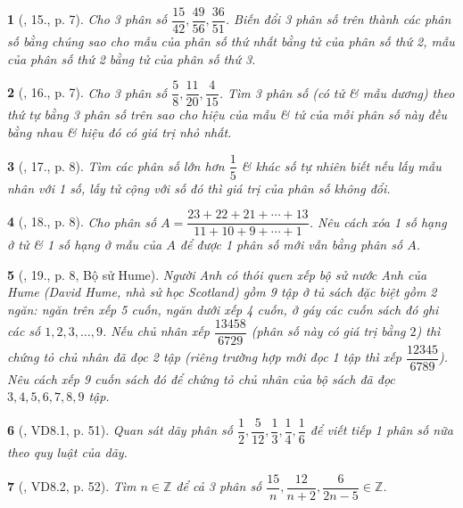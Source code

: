 \documentclass{article}
\newtheorem{baitoan}{}
\begin{document}
\begin{baitoan}[\cite{Binh_Toan_6_tap_2}, 15., p. 7]
	Cho 3 phân số $\dfrac{15}{42},\dfrac{49}{56},\dfrac{36}{51}$. Biến đổi 3 phân số trên thành các phân số bằng chúng sao cho mẫu của phân số thứ nhất bằng tử của phân số thứ 2, mẫu của phân số thứ 2 bằng tử của phân số thứ 3.
\end{baitoan}

\begin{baitoan}[\cite{Binh_Toan_6_tap_2}, 16., p. 7]
	Cho 3 phân số $\dfrac{5}{8},\dfrac{11}{20},\dfrac{4}{15}$. Tìm 3 phân số (có tử \& mẫu dương) theo thứ tự bằng 3 phân số trên sao cho hiệu của mẫu \& tử của mỗi phân số này đều bằng nhau \& hiệu đó có giá trị nhỏ nhất.
\end{baitoan}

\begin{baitoan}[\cite{Binh_Toan_6_tap_2}, 17., p. 8]
	Tìm các phân số lớn hơn $\dfrac{1}{5}$ \& khác số tự nhiên biết nếu lấy mẫu nhân với 1 số, lấy tử cộng với số đó thì giá trị của phân số không đổi.
\end{baitoan}

\begin{baitoan}[\cite{Binh_Toan_6_tap_2}, 18., p. 8]
	Cho phân số $A = \dfrac{23 + 22 + 21 + \cdots + 13}{11 + 10 + 9 + \cdots + 1}$. Nêu cách xóa 1 số hạng ở tử \& 1 số hạng ở mẫu của $A$ để được 1 phân số mới vẫn bằng phân số $A$.
\end{baitoan}

\begin{baitoan}[\cite{Binh_Toan_6_tap_2}, 19., p. 8, Bộ sử Hume]
	Người Anh có thói quen xếp bộ sử nước Anh của Hume (David Hume, nhà sử học Scotland) gồm 9 tập ở tủ sách đặc biệt gồm 2 ngăn: ngăn trên xếp 5 cuốn, ngăn dưới xếp 4 cuốn, ở gáy các cuốn sách đó ghi các số $1,2,3,\ldots,9$. Nếu chủ nhân xếp $\dfrac{13458}{6729}$ (phân số này có giá trị bằng $2$) thì chứng tỏ chủ nhân đã đọc 2 tập (riêng trường hợp mới đọc 1 tập thì xếp $\dfrac{12345}{6789}$). Nêu cách xếp 9 cuốn sách đó để chứng tỏ chủ nhân của bộ sách đã đọc $3,4,5,6,7,8,9$ tập.
\end{baitoan}

\begin{baitoan}[\cite{TLCT_THCS_Toan_6_so_hoc}, VD8.1, p. 51]
	Quan sát dãy phân số $\dfrac{1}{2},\dfrac{5}{12},\dfrac{1}{3},\dfrac{1}{4},\dfrac{1}{6}$ để viết tiếp 1 phân số nữa theo quy luật của dãy.
\end{baitoan}

\begin{baitoan}[\cite{TLCT_THCS_Toan_6_so_hoc}, VD8.2, p. 52]
	Tìm $n\in\mathbb{Z}$ để cả 3 phân số $\dfrac{15}{n},\dfrac{12}{n + 2},\dfrac{6}{2n - 5}\in\mathbb{Z}$.
\end{baitoan}
\end{document}
